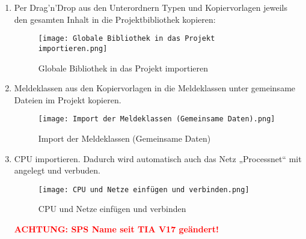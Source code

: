 \begin{enumerate}
    \item Per Drag’n’Drop aus den Unterordnern Typen und Kopiervorlagen jeweils den gesamten Inhalt in die Projektbibliothek kopieren:
    \begin{figure}[!ht]
        \centering
        \texttt{[image: Globale Bibliothek in das Projekt importieren.png]}
        \caption{Globale Bibliothek in das Projekt importieren}
        \label{fig:Globale Bibliothek in das Projekt importieren}
    \end{figure}
\clearpage
    \item Meldeklassen aus den Kopiervorlagen in die Meldeklassen unter gemeinsame Dateien im Projekt kopieren. 
    \begin{figure}[!ht]
        \centering
        \texttt{[image: Import der Meldeklassen (Gemeinsame Daten).png]}
        \caption{Import der Meldeklassen (Gemeinsame Daten)}
        \label{fig:Import der Meldeklassen (Gemeinsame Daten)}
    \end{figure}

    \item CPU importieren. Dadurch wird automatisch auch das Netz „Processnet“ mit angelegt und verbuden.
    \begin{figure}[!ht]
        \centering
        \texttt{[image: CPU und Netze einfügen und verbinden.png]}
        \caption{CPU und Netze einfügen und verbinden}
        \label{fig:CPU und Netze einfügen und verbinden}
    \end{figure}
    \textcolor{red}{\textbf{ACHTUNG: SPS Name seit TIA V17 geändert!}}



\end{enumerate}
